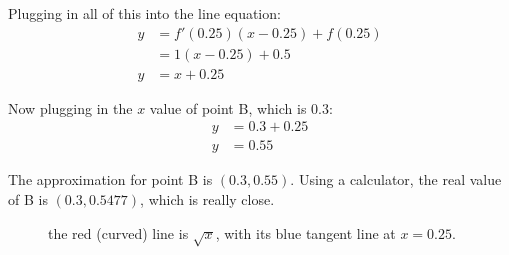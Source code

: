\documentclass[12pt]{article}
\begin{document}
            \noindent Plugging in all of this into the line equation:
            \begin{align*}
                y &= f'(0.25)(x-0.25) + f(0.25) \\
                &= 1(x-0.25) + 0.5 \\
                y &= x+0.25
            \end{align*}

            \noindent Now plugging in the $x$ value of point B, which is $0.3$:
            \begin{align*}
                y &= 0.3 + 0.25 \\
                y &= 0.55
            \end{align*}

            The approximation for point B is $(0.3, 0.55)$. Using a calculator, the real value of B is $(0.3, 0.5477)$, which is really close.

            \begin{figure}[h]
                \begin{center}
                    \caption{the red (curved) line is $\sqrt{x}$, with its blue tangent line at $x=0.25$.}
                    \label{fig:locallinapprox}
                \end{center}
            \end{figure}
\end{document}
